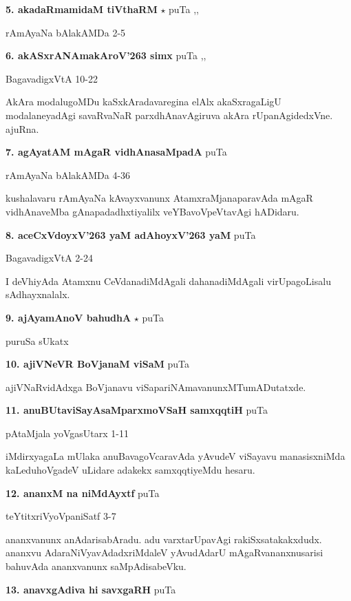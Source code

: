 \medskip
\noindent\textbf{5. akadaRmamidaM tiVthaRM } $\star$ \hfill puTa \pageref{156},\pageref{164},\pageref{175}

\hfill rAmAyaNa bAlakAMDa 2-5

\medskip
\noindent\textbf{6. akASxrANAmakAroV\char'263 simx } \hfill puTa \pageref{93c},\pageref{95},\pageref{97}

\hfill BagavadigxVtA 10-22

AkAra modalugoMDu kaSxkAradavaregina elAlx akaSxragaLigU modalaneyadAgi savaRvaNaR parxdhAnavAgiruva akAra rUpanAgidedxVne. ajuRna. 

\medskip
\noindent\textbf{7. agAyatAM mAgaR vidhAnasaMpadA} \hfill puTa \pageref{188}

\hfill rAmAyaNa bAlakAMDa 4-36

kushalavaru rAmAyaNa kAvayxvanunx AtamxraMjanaparavAda mAgaR vidhAnaveMba gAnapadadhxtiyalilx veYBavoVpeVtavAgi hADidaru.

\medskip
\noindent\textbf{8. aceCxVdoyxV\char'263 yaM adAhoyxV\char'263 yaM } \hfill puTa \pageref{36}

\hfill BagavadigxVtA 2-24

I deVhiyAda Atamxnu CeVdanadiMdAgali dahanadiMdAgali virUpagoLisalu sAdhayxnalalx.

\medskip
\noindent\textbf{9. ajAyamAnoV bahudhA} $\star$ \hfill puTa\pageref{150a}

\hfill puruSa sUkatx

\medskip
\noindent\textbf{10. ajiVNeVR BoVjanaM viSaM } \hfill puTa \pageref{265}

\hfill ajiVNaRvidAdxga BoVjanavu viSapariNAmavanunxMTumADutatxde.

\medskip
\noindent\textbf{11. anuBUtaviSayAsaMparxmoVSaH samxqqtiH} \hfill puTa \pageref{81}

\hfill pAtaMjala yoVgasUtarx 1-11

iMdirxyagaLa mUlaka anuBavagoVcaravAda yAvudeV viSayavu manasisxniMda kaLeduhoVgadeV uLidare adakekx samxqqtiyeMdu hesaru.

\medskip
\noindent\textbf{12. ananxM na niMdAyxtf} \hfill puTa \pageref{76}

\hfill teYtitxriVyoVpaniSatf 3-7

ananxvanunx anAdarisabAradu. adu varxtarUpavAgi rakiSxsatakakxdudx. ananxvu AdaraNiVyavAdadxriMdaleV yAvudAdarU mAgaRvananxnusarisi bahuvAda ananxvanunx saMpAdisabeVku.

\medskip
\noindent\textbf{13. anavxgAdiva hi savxgaRH} \hfill puTa \pageref{252}

